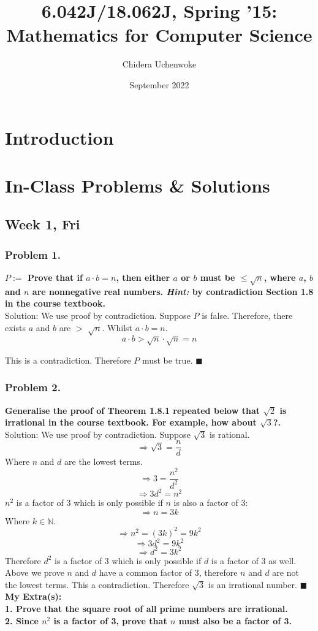 \documentclass{article}
\title{6.042J/18.062J, Spring '15: Mathematics for Computer Science}
\author{Chidera Uchenwoke}
\date{September 2022}
\begin{document}
\maketitle
\tableofcontents

\section{Introduction}

\section{In-Class Problems \& Solutions}
\subsection{Week 1, Fri}

\subsubsection{Problem 1.}
\textbf{\(P := \) Prove that if $a \cdot b = n $, then either $a$ or $b$ must be $\leq \sqrt{n}$, where $a$, $b$ and $n$ are nonnegative real numbers. \textit{Hint:} by contradiction Section 1.8 in the course textbook.}
\\[5pt]
Solution: We use proof by contradiction. Suppose \(P\) is false. Therefore, there exists \(a\) and \(b\) are \(>\) \(\sqrt{n}\). Whilst $a \cdot b = n$.
\[a \cdot b > \sqrt{n} \cdot \sqrt{n} = n\]

\noindent This is a contradiction. Therefore \(P\) must be true.
$ \blacksquare $

\subsubsection{Problem 2.}
\textbf{Generalise the proof of Theorem 1.8.1 repeated below that $\sqrt{2}$ is irrational in the course textbook. For example, how about $\sqrt{3}$?.}
\\[5pt]
Solution: We use proof by contradiction. Suppose \(\sqrt{3}\) is rational. 
\[\Rightarrow \sqrt{3} = \frac{n}{d}\]
Where \(n\) and \(d\) are the lowest terms.
\[\Rightarrow 3 = \frac{n^2}{d^2}\]
\[\Rightarrow 3d^2 = n^2 \]
\(n^2\) is a factor of 3 which is only possible if \(n\) is also a factor of 3:
\[\Rightarrow n = 3k\]
Where \(k \in \mathbb{N}\).
\[\Rightarrow n^2 = (3k)^2 = 9k^2\]
\[\Rightarrow 3d^2 = 9k^2\]
\[\Rightarrow d^2 = 3k^2\]
Therefore \(d^2\) is a factor of 3 which is only possible if \(d\) is a factor of 3 as well.
\\[5pt]
Above we prove \(n\) and \(d\) have a common factor of 3, therefore \(n\) and \(d\) are not the lowest terms. This a contradiction. Therefore $\sqrt{3}$ is an irrational number.
$\blacksquare$
\\[5pt]
\noindent
\textbf{My Extra(s):\\
1. Prove that the square root of all prime numbers are irrational.\\
2. Since $n^{2}$ is a factor of 3, prove that $n$ must also be a factor of 3.}
\end{document}
